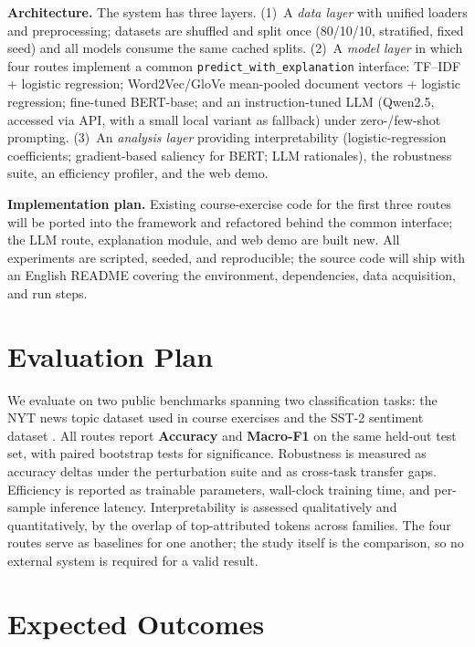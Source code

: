 \documentclass[11pt]{article}
\begin{document}
\textbf{Architecture.} The system has three layers. (1)~A \emph{data layer} with unified loaders and preprocessing; datasets are shuffled and split once (80/10/10, stratified, fixed seed) and all models consume the same cached splits. (2)~A \emph{model layer} in which four routes implement a common \texttt{predict\_with\_explanation} interface: TF--IDF + logistic regression; Word2Vec/GloVe mean-pooled document vectors + logistic regression; fine-tuned BERT-base; and an instruction-tuned LLM (Qwen2.5, accessed via API, with a small local variant as fallback) under zero-/few-shot prompting. (3)~An \emph{analysis layer} providing interpretability (logistic-regression coefficients; gradient-based saliency for BERT; LLM rationales), the robustness suite, an efficiency profiler, and the web demo.

\textbf{Implementation plan.} Existing course-exercise code for the first three routes will be ported into the framework and refactored behind the common interface; the LLM route, explanation module, and web demo are built new. All experiments are scripted, seeded, and reproducible; the source code will ship with an English README covering the environment, dependencies, data acquisition, and run steps.

\section{Evaluation Plan}

We evaluate on two public benchmarks spanning two classification tasks: the NYT news topic dataset used in course exercises \citep{sandhaus2008nyt} and the SST-2 sentiment dataset \citep{socher-2013-recursive}. All routes report \textbf{Accuracy} and \textbf{Macro-F1} on the same held-out test set, with paired bootstrap tests for significance. Robustness is measured as accuracy deltas under the perturbation suite and as cross-task transfer gaps. Efficiency is reported as trainable parameters, wall-clock training time, and per-sample inference latency. Interpretability is assessed qualitatively and quantitatively, by the overlap of top-attributed tokens across families. The four routes serve as baselines for one another; the study itself is the comparison, so no external system is required for a valid result.

\section{Expected Outcomes}
\end{document}
